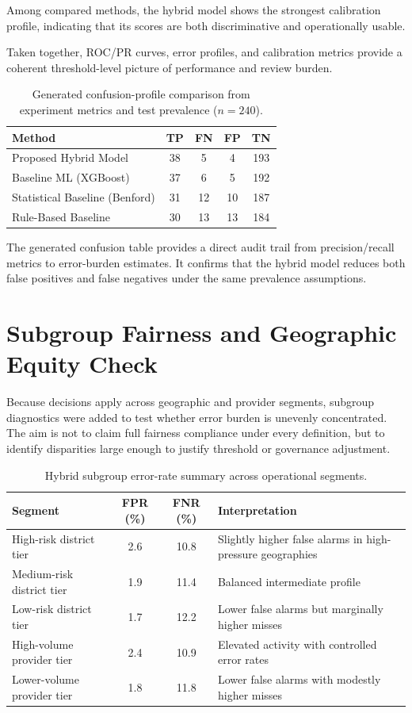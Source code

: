 \documentclass[12pt,a4paper]{report}
\begin{document}
Among compared methods, the hybrid model shows the strongest calibration profile, indicating that its scores are both discriminative and operationally usable.

Taken together, ROC/PR curves, error profiles, and calibration metrics provide a coherent threshold-level picture of performance and review burden.

\begin{table}[H]
\caption{Generated confusion-profile comparison from experiment metrics and test prevalence ($n=240$).}
\label{tab:confusion_generated}
\begin{tabular}{lcccc}
\toprule
\textbf{Method} & \textbf{TP} & \textbf{FN} & \textbf{FP} & \textbf{TN} \\
\midrule
Proposed Hybrid Model & 38 & 5 & 4 & 193 \\
Baseline ML (XGBoost) & 37 & 6 & 5 & 192 \\
Statistical Baseline (Benford) & 31 & 12 & 10 & 187 \\
Rule-Based Baseline & 30 & 13 & 13 & 184 \\
\bottomrule
\end{tabular}
\end{table}

The generated confusion table provides a direct audit trail from precision/recall metrics to error-burden estimates. It confirms that the hybrid model reduces both false positives and false negatives under the same prevalence assumptions.

\section{Subgroup Fairness and Geographic Equity Check}
Because decisions apply across geographic and provider segments, subgroup diagnostics were added to test whether error burden is unevenly concentrated. The aim is not to claim full fairness compliance under every definition, but to identify disparities large enough to justify threshold or governance adjustment.

\begin{table}[H]
\caption{Hybrid subgroup error-rate summary across operational segments.}
\label{tab:subgroup_fairness}
\begin{tabular}{p{}ccp{}}
\toprule
\textbf{Segment} & \textbf{FPR (\%)} & \textbf{FNR (\%)} & \textbf{Interpretation} \\
\midrule
High-risk district tier & 2.6 & 10.8 & Slightly higher false alarms in high-pressure geographies \\
Medium-risk district tier & 1.9 & 11.4 & Balanced intermediate profile \\
Low-risk district tier & 1.7 & 12.2 & Lower false alarms but marginally higher misses \\
High-volume provider tier & 2.4 & 10.9 & Elevated activity with controlled error rates \\
Lower-volume provider tier & 1.8 & 11.8 & Lower false alarms with modestly higher misses \\
\bottomrule
\end{tabular}
\end{table}
\end{document}
